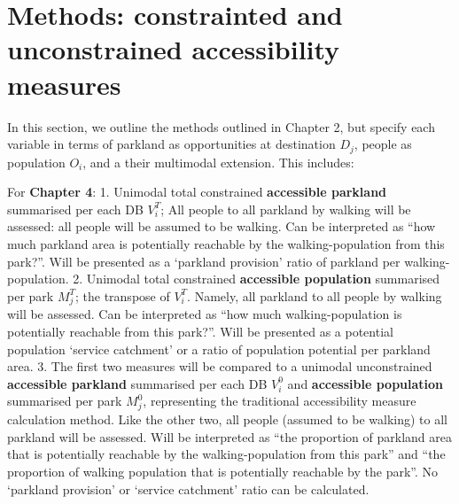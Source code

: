 \documentclass[
11pt, %
oneside, %
english, %
singlespacing, %
]{macthesis} %
\begin{document}
\section{Methods: constrainted and unconstrained accessibility measures}\label{methods-constrainted-and-unconstrained-accessibility-measures}

In this section, we outline the methods outlined in Chapter 2, but specify each variable in terms of parkland as opportunities at destination \(D_j\), people as population \(O_i\), and a their multimodal extension. This includes:

For \textbf{Chapter 4}:
1. Unimodal total constrained \textbf{accessible parkland} summarised per each DB \(V_i^T\); All people to all parkland by walking will be assessed: all people will be assumed to be walking. Can be interpreted as ``how much parkland area is potentially reachable by the walking-population from this park?''. Will be presented as a `parkland provision' ratio of parkland per walking-population.
2. Unimodal total constrained \textbf{accessible population} summarised per park \(M_j^T\); the transpose of \(V_i^T\). Namely, all parkland to all people by walking will be assessed. Can be interpreted as ``how much walking-population is potentially reachable from this park?''. Will be presented as a potential population `service catchment' or a ratio of population potential per parkland area.
3. The first two measures will be compared to a unimodal unconstrained \textbf{accessible parkland} summarised per each DB \(V_i^0\) and \textbf{accessible population} summarised per park \(M_j^0\), representing the traditional accessibility measure calculation method. Like the other two, all people (assumed to be walking) to all parkland will be assessed. Will be interpreted as ``the proportion of parkland area that is potentially reachable by the walking-population from this park'' and ``the proportion of walking population that is potentially reachable by the park''. No `parkland provision' or `service catchment' ratio can be calculated.
\end{document}
